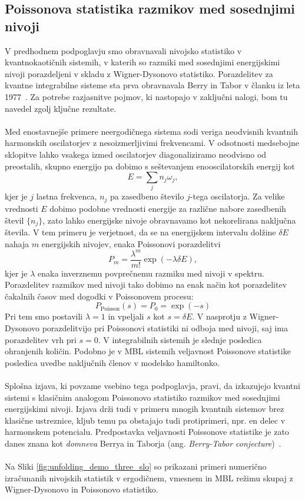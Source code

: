 \documentclass[10pt,a4paper]{article}
\begin{document}
 \subsection{Poissonova statistika razmikov med sosednjimi nivoji}
 V predhodnem podpoglavju smo obravnavali nivojsko statistiko v kvantnokaotičnih sistemih, v katerih so razmiki med sosednjimi energijskimi nivoji porazdeljeni v skladu z Wigner-Dysonovo statistiko. Porazdelitev za kvantne integrabilne sisteme sta prva obravnavala Berry in Tabor v članku iz leta 1977~\cite{berry1977level}. Za potrebe razjasnitve pojmov, ki nastopajo v zaključni nalogi, bom tu navedel zgolj ključne rezultate. \\\\
 Med enostavnejše primere neergodičnega sistema sodi veriga neodvisnih kvantnih harmonskih oscilatorjev z nesoizmerljivimi frekvencami. V odsotnosti medsebojne sklopitve lahko vsakega izmed oscilatorjev diagonaliziramo neodvisno od preostalih, skupno energijo pa dobimo s seštevanjem enooscilatorskih energij kot 
 $$
 E=\sum_j n_j\omega_j,
 $$ 
 kjer je $j$ lastna frekvenca, $n_j$ pa zasedbeno število $j$-tega oscilatorja. Za velike vrednosti $E$ dobimo podobne vrednosti energije za različne nabore zasedbenih števil $\{n_j\}$, zato lahko energijske nivoje obravnavamo kot nekorelirana naključna števila. V tem primeru je verjetnost, da se na energijskem intervalu dolžine $\delta E$ nahaja $m$ energijskih nivojev, enaka Poissonovi porazdelitvi 
 \begin{equation}
 P_m=\frac{\lambda^m}{m!}\exp\left(-\lambda \delta E\right),
 \end{equation}
 kjer je $\lambda$ enaka inverznemu povprečnemu razmiku med nivoji v spektru. Porazdelitev razmikov med nivoji tako dobimo na enak način kot porazdelitev čakalnih časov med dogodki v Poissonovem procesu:
 \begin{equation}\label{eq:poisson}
 P_\mathrm{Poisson}(s)=P_0=\exp\left(-s\right)
 \end{equation}
 Pri tem smo postavili $\lambda=1$ in vpeljali $s$ kot  $s=\delta E$. V nasprotju z Wigner-Dysonovo porazdelitvijo pri Poissonovi statistiki ni odboja med nivoji, saj ima porazdelitev vrh pri $s=0$. V integrabilnih sistemih je slednje posledica ohranjenih količin. Podobno je v MBL sistemih veljavnost Poissonove statistike posledica uvedbe naključnih členov v modelsko hamiltonko. \\\\
 Splošna izjava, ki povzame vsebino tega podpoglavja, pravi, da izkazujejo kvantni sistemi s klasičnim analogom Poissonovo statistiko razmikov med sosednjimi energijskimi nivoji. Izjava drži tudi v primeru mnogih kvantnih sistemov brez klasične ustreznice, kljub temu pa obstajajo tudi protiprimeri, npr. en delec v harmonskem potencialu. Predpostavka veljavnosti Poissonove statistike je zato danes znana kot \emph{domneva} Berrya in Taborja (ang. \emph{Berry-Tabor conjecture})~\cite{berry1977level}.\\\\
 Na Sliki \ref{fig:unfolding_demo_three_slo} so prikazani primeri numerično izračunanih nivojskih statistik v ergodičnem, vmesnem in MBL režimu skupaj z Wigner-Dysonovo in Poissonovo statistiko. 
\end{document}
